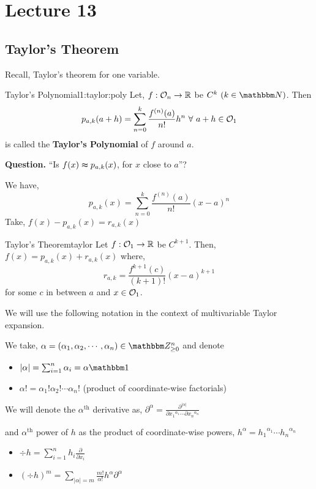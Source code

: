 \documentclass[../Analysis-3.tex]{subfiles}
\begin{document}
\chapter*{Lecture 13} %
\setcounter{chapter}{13} %
\setcounter{section}{0}

\section{Taylor's Theorem}
Recall, Taylor's theorem for one variable.
\begin{Def}{Taylor's Polynomial}{1:taylor:poly}
  Let, $ f : \mathcal{O}_{n} \to \mathbb{R} $ be $C^k \ (k \in \N)$. Then
  \[ p_{a,k}(a+h) = \sum_{n = 0}^{k} \frac{f^{(n)}(a)}{n!} h^{n} \ \forall\ a+h \in \mathcal{O}_{1} \]
  is called the \textbf{Taylor's Polynomial} of $f$ around $a$.
\end{Def}

\textbf{Question.} ``Is $f(x) \thickapprox  p_{a,k}(x)$, for $x$ close to $a$''?

We have,
\[  p_{a,k}(x) = \sum_{n = 0}^{k} \frac{f^{(n)}(a)}{n!} (x-a)^{n} \]
Take, $f(x) - p_{a,k}(x) = r_{a,k}(x)$

\begin{Thm}{Taylor's Theorem}{taylor}
  Let $ f: \mathcal{O}_{1} \to \mathbb{R} $ be $C^{k+1}$. Then, $f(x) = p_{a,k}(x) + r_{a,k}(x)$ where,
  \[r_{a,k} = \frac{f^{k+1}(c)}{(k+1)!} (x-a)^{k+1}\]
  for some $c$ in between $a$ and $x \in \mathcal{O}_{1}$.
\end{Thm}

We will use the following notation in the context of multivariable Taylor expansion.

\begin{notnBox}{}{}
  We take, $\alpha = (\alpha_1 , \alpha_2 , \cdots , \alpha_n) \in \Z_{\geq 0}^{n}$ and denote
  \begin{itemize}
    \item $|\alpha| = \sum_{i = 1}^{n} \alpha_i = \alpha\bb{1}$
    \item $\alpha ! = \alpha_1 ! \alpha_2 ! \cdots \alpha_n !$ (product of coordinate-wise factorials)
  \end{itemize}
  We will denote the $ \alpha^{\text{th}} $ derivative as, $\displaystyle\partial^{\alpha} = \frac{\partial^{|\alpha|}}{\partial {x_1}^{\alpha_1} \cdots \partial {x_n}^{\alpha_n}}$

  and $ \alpha^{\text{th}} $ power of $ h $ as the product of coordinate-wise powers, $h^{\alpha} = {h_1}^{\alpha_1} \cdots {h_n}^{\alpha_n}$
  \begin{itemize}
    \item $\displaystyle\div h = \sum_{i=1}^n h_i\frac{\partial}{\partial x_i}$
    \item $\displaystyle(\div h)^m = \sum_{| \alpha | = m } \frac{m!}{\alpha!} h^{\alpha} \partial^{\alpha}$
  \end{itemize}
\end{notnBox}
\end{document}
